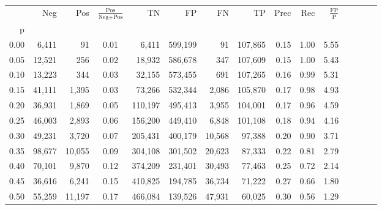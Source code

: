\begin{tabular}{rrrcrrrrrrrrrrr}
\toprule
{} &     Neg &     Pos & $\frac{\text{Pos}}{\text{Neg}+\text{Pos}}$ &       TN &       FP &       FN &       TP &  Prec &   Rec & $\frac{\text{FP}}{\text{P}}$ \\
p    &         &         &                                            &          &          &          &          &       &       &                              \\
\midrule
0.00 &   6,411 &      91 &                                       0.01 &    6,411 &  599,199 &       91 &  107,865 &  0.15 &  1.00 &                         5.55 \\
0.05 &  12,521 &     256 &                                       0.02 &   18,932 &  586,678 &      347 &  107,609 &  0.15 &  1.00 &                         5.43 \\
0.10 &  13,223 &     344 &                                       0.03 &   32,155 &  573,455 &      691 &  107,265 &  0.16 &  0.99 &                         5.31 \\
0.15 &  41,111 &   1,395 &                                       0.03 &   73,266 &  532,344 &    2,086 &  105,870 &  0.17 &  0.98 &                         4.93 \\
0.20 &  36,931 &   1,869 &                                       0.05 &  110,197 &  495,413 &    3,955 &  104,001 &  0.17 &  0.96 &                         4.59 \\
0.25 &  46,003 &   2,893 &                                       0.06 &  156,200 &  449,410 &    6,848 &  101,108 &  0.18 &  0.94 &                         4.16 \\
0.30 &  49,231 &   3,720 &                                       0.07 &  205,431 &  400,179 &   10,568 &   97,388 &  0.20 &  0.90 &                         3.71 \\
0.35 &  98,677 &  10,055 &                                       0.09 &  304,108 &  301,502 &   20,623 &   87,333 &  0.22 &  0.81 &                         2.79 \\
0.40 &  70,101 &   9,870 &                                       0.12 &  374,209 &  231,401 &   30,493 &   77,463 &  0.25 &  0.72 &                         2.14 \\
0.45 &  36,616 &   6,241 &                                       0.15 &  410,825 &  194,785 &   36,734 &   71,222 &  0.27 &  0.66 &                         1.80 \\
0.50 &  55,259 &  11,197 &                                       0.17 &  466,084 &  139,526 &   47,931 &   60,025 &  0.30 &  0.56 &                         1.29 \\

\end{tabular}
